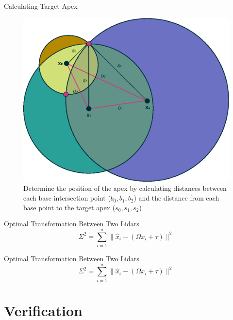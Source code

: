 \documentclass{beamer}
\begin{document}
\begin{frame}{Calculating Target Apex}
    \begin{figure}
        \centering 
        \includegraphics[height=.55\textwidth]{Images/circle.png}
        \caption{Determine the position of the apex by calculating distances between each base intersection point ($b_{0}, b_{1}, b_{2}$) and the distance from each base point to the target apex ($s_{0}, s_{1}, s_{2}$)}
    \end{figure}
\end{frame}

\begin{frame}{Optimal Transformation Between Two Lidars}
    \[
    \Sigma^2 = \displaystyle\sum\limits_{i=1}^n {\parallel \hat{x}_i - ({\Omega}x_i + \tau) \parallel^2} \]
    \begin{figure}
        \centering
        
    \end{figure}
\end{frame}

\begin{frame}{Optimal Transformation Between Two Lidars}
    \[
    \Sigma^2 = \displaystyle\sum\limits_{i=1}^n {\parallel \hat{x}_i - ({\Omega}x_i + \tau) \parallel^2} \]
    \begin{figure}
        \centering
        
    \end{figure}
\end{frame}


\section{Verification}
\end{document}
